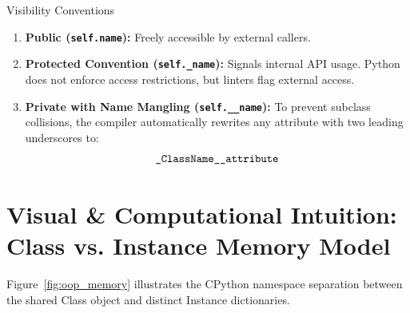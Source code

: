 \begin{definitionbox}{Visibility Conventions}
 
\begin{enumerate}
    \item \textbf{Public (\texttt{self.name}):} Freely accessible by external callers.
    \item \textbf{Protected Convention (\texttt{self.\_name}):} Signals internal API usage. Python does not enforce access restrictions, but linters flag external access.
    \item \textbf{Private with Name Mangling (\texttt{self.\_\_name}):} To prevent subclass collisions, the compiler automatically rewrites any attribute with two leading underscores to:
    \begin{equation}
    \text{\texttt{\_ClassName\_\_attribute}}
    \end{equation}
\end{enumerate}
\end{definitionbox}

\section{Visual \& Computational Intuition: Class vs. Instance Memory Model}

Figure~\ref{fig:oop_memory} illustrates the CPython namespace separation between the shared Class object and distinct Instance dictionaries.


